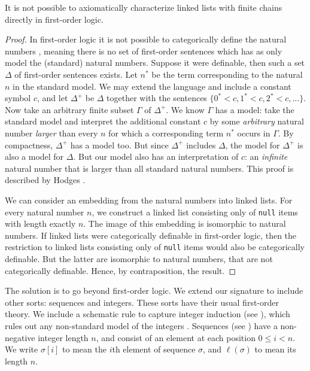 \documentclass[runningheads]{llncs}
\begin{document}
\begin{proposition}
It is not possible to axiomatically characterize linked lists with finite chains directly in first-order logic.
\end{proposition}
\begin{proof}
In first-order logic it is not possible to categorically define the natural numbers \cite{benthem2001hol}, meaning there is no set of first-order sentences which has as only model the (standard) natural numbers. Suppose it were definable, then such a set $\Delta$ of first-order sentences exists. Let $n^*$ be the term corresponding to the natural $n$ in the standard model. We may extend the language and include a constant symbol $c$, and let $\Delta^+$ be $\Delta$ together with the sentences $\{0^* < c, 1^* < c, 2^* < c, \ldots\}$. Now take an arbitrary finite subset $\Gamma$ of $\Delta^+$. We know $\Gamma$ has a model: take the standard model and interpret the additional constant $c$ by some \emph{arbitrary} natural number \emph{larger} than every $n$ for which a corresponding term $n^*$ occurs in $\Gamma$. By compactness, $\Delta^+$ has a model too. But since $\Delta^+$ includes $\Delta$, the model for $\Delta^+$ is also a model for $\Delta$. But our model also has an interpretation of $c$: an \emph{infinite} natural number that is larger than all standard natural numbers. This proof is described by Hodges \cite[Chapter 20]{Hodges1983}.

We can consider an embedding from the natural numbers into linked lists. For every natural number $n$, we construct a linked list consisting only of \texttt{null} items with length exactly $n$. The image of this embedding is isomorphic to natural numbers. If linked lists were categorically definable in first-order logic, then the restriction to linked lists consisting only of \texttt{null} items would also be categorically definable. But the latter are isomorphic to natural numbers, that are not categorically definable. Hence, by contraposition, the result.
\end{proof}

The solution is to go beyond first-order logic. We extend our signature to include other sorts: sequences and integers. These sorts have their usual first-order theory. We include a schematic rule to capture integer induction (see \cite[Section 2.4.2]{KeYbook}), which rules out any non-standard model of the integers \cite{benthem2001hol}. Sequences (see \cite[Chapter 5.2]{KeYbook}) have a non-negative integer length $n$, and consist of an element at each position $0\leq i<n$. We write $\sigma[i]$ to mean the $i$th element of sequence $\sigma$, and $\ell(\sigma)$ to mean its length $n$.
\end{document}
